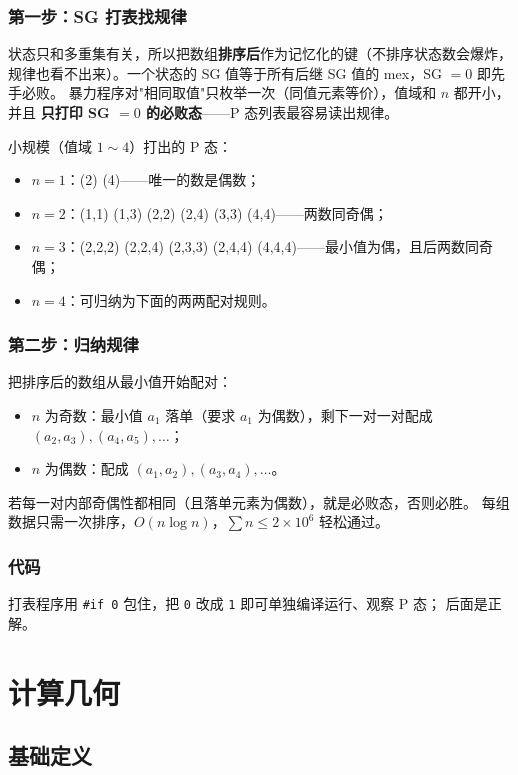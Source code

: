 \documentclass[11pt,a4paper,twocolumn]{ctexart}  %
\begin{document}
\subsubsection*{第一步：SG 打表找规律}

状态只和多重集有关，所以把数组\textbf{排序后}作为记忆化的键（不排序状态数会爆炸，
规律也看不出来）。一个状态的 SG 值等于所有后继 SG 值的 mex，SG $=0$ 即先手必败。
暴力程序对"相同取值"只枚举一次（同值元素等价），值域和 $n$ 都开小，并且
\textbf{只打印 SG $=0$ 的必败态}——P 态列表最容易读出规律。

小规模（值域 $1\sim 4$）打出的 P 态：
\begin{itemize}
    \item $n=1$：(2) (4)——唯一的数是偶数；
    \item $n=2$：(1,1) (1,3) (2,2) (2,4) (3,3) (4,4)——两数同奇偶；
    \item $n=3$：(2,2,2) (2,2,4) (2,3,3) (2,4,4) (4,4,4)——最小值为偶，且后两数同奇偶；
    \item $n=4$：可归纳为下面的两两配对规则。
\end{itemize}

\subsubsection*{第二步：归纳规律}

把排序后的数组从最小值开始配对：
\begin{itemize}
    \item $n$ 为奇数：最小值 $a_1$ 落单（要求 $a_1$ 为偶数），剩下一对一对配成
          $(a_2,a_3),(a_4,a_5),\dots$；
    \item $n$ 为偶数：配成 $(a_1,a_2),(a_3,a_4),\dots$。
\end{itemize}
若每一对内部奇偶性都相同（且落单元素为偶数），就是必败态，否则必胜。
每组数据只需一次排序，$O(n\log n)$，$\sum n \le 2\times 10^6$ 轻松通过。

\subsubsection*{代码}
打表程序用 \texttt{\#if 0} 包住，把 \texttt{0} 改成 \texttt{1} 即可单独编译运行、观察 P 态；
后面是正解。


\section{计算几何}
\subsection{基础定义}

\end{document}
